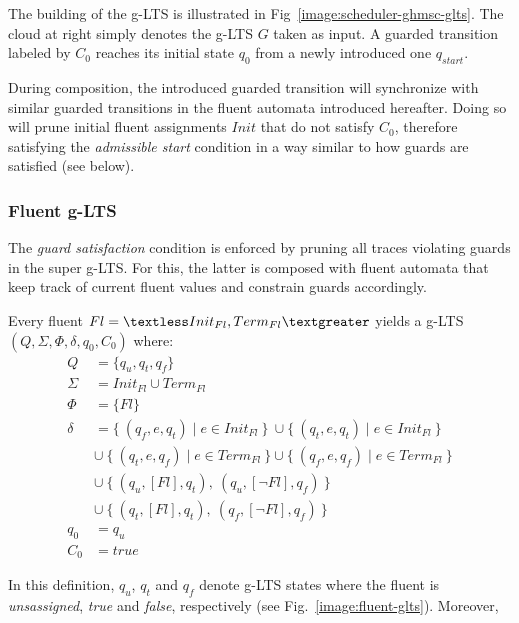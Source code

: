 The building of the g-LTS is illustrated in Fig~\ref{image:scheduler-ghmsc-glts}. The cloud at right simply denotes the g-LTS $G$ taken as input. A guarded transition labeled by $C_0$ reaches its initial state $q_0$ from a newly introduced one $q_{start}$.

During composition, the introduced guarded transition will synchronize with similar guarded transitions in the fluent automata introduced hereafter. Doing so will prune initial fluent assignments $Init$ that do not satisfy $C_0$, therefore satisfying the \emph{admissible start} condition in a way similar to how guards are satisfied (see below).

\subsubsection*{Fluent g-LTS}

The \emph{guard satisfaction} condition is enforced by pruning all traces violating guards in the super g-LTS. For this, the latter is composed with fluent automata that keep track of current fluent values and constrain guards accordingly.

Every fluent $Fl = \textless Init_{Fl}, Term_{Fl} \textgreater $ yields a g-LTS $(Q,\Sigma,\Phi,\delta,q_{0},C_{0})$ where:
\begin{align*}
Q      &= \{q_u,q_t,q_f\}            \\
\Sigma &= Init_{Fl} \cup Term_{Fl}   \\
\Phi   &= \{ Fl \} \\
\delta &=    \{~(q_f,e,q_t) \mid e \in Init_{Fl}~\}~\cup \{~(q_t,e,q_t) \mid e \in Init_{Fl}~\} \\
       &\cup~\{~(q_t,e,q_f) \mid e \in Term_{Fl}~\} \cup \{~(q_f,e,q_f) \mid e \in Term_{Fl}~\} \\
       &\cup~\{~(q_u, [Fl], q_t),~(q_u, [\neg Fl], q_f)~\} \\
       &\cup~\{~(q_t, [Fl], q_t),~(q_f, [\neg Fl], q_f)~\} \\
q_0    &= q_u \\
C_0    &= true
\end{align*}

In this definition, $q_u$, $q_t$ and $q_f$ denote g-LTS states where the fluent is \emph{unsassigned}, \emph{true} and \emph{false}, respectively (see Fig.~\ref{image:fluent-glts}). Moreover,

